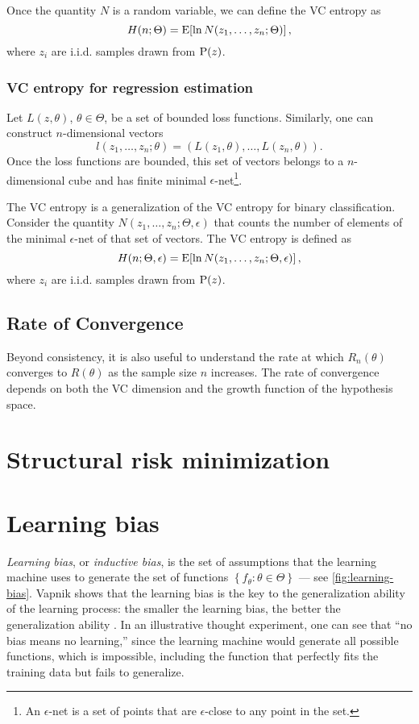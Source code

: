 Once the quantity $N$ is a random variable, we can define the VC entropy as
\[
  H(n; \Theta) = \operatorname{E}\!\left[ \ln N(z_1, \dots, z_n; \Theta) \right]\text{,}
\]
where $z_i$ are i.i.d. samples drawn from $\operatorname{P}(z)$.

\subsubsection{VC entropy for regression estimation}

Let $L(z, \theta)$, $\theta \in \Theta$, be a set of bounded loss functions.  Similarly,
one can construct $n$-dimensional vectors
\[
  l(z_1, \dots, z_n; \theta) = \left( L(z_1, \theta), \dots, L(z_n, \theta) \right)\text{.}
\]
Once the loss functions are bounded, this set of vectors belongs to a $n$-dimensional
cube and has finite minimal $\epsilon$-net\footnote{An $\epsilon$-net is a set of points
that are $\epsilon$-close to any point in the set.}.

The VC entropy is a generalization of the VC entropy for binary classification.
Consider the quantity $N(z_1, \dots, z_n; \Theta, \epsilon)$ that counts the number of
elements of the minimal $\epsilon$-net of that set of vectors.  The VC entropy is defined
as
\[
  H(n; \Theta, \epsilon) = \operatorname{E}\!\left[ \ln N(z_1, \dots, z_n; \Theta, \epsilon) \right]\text{,}
\]
where $z_i$ are i.i.d. samples drawn from $\operatorname{P}(z)$.

\subsection{Rate of Convergence}

Beyond consistency, it is also useful to understand the rate at which $R_n(\theta)$
converges to $R(\theta)$ as the sample size $n$ increases. The rate of convergence depends
on both the VC dimension and the growth function of the hypothesis space.


\section{Structural risk minimization}


\section{Learning bias}

\emph{Learning bias}, or \emph{inductive bias}, is the set of assumptions that the
learning machine uses to generate the set of functions $\left\{ f_\theta : \theta \in
\Theta \right\}$ --- see \cref{fig:learning-bias}.  Vapnik shows that the learning bias is the key to the generalization
ability of the learning process: the smaller the learning bias, the better the
generalization ability \parencite{Vapnik1999b}.  In an illustrative thought experiment,
one can see that ``no bias means no learning,'' since the learning machine would generate
all possible functions, which is impossible, including the function that perfectly fits
the training data but fails to generalize.

